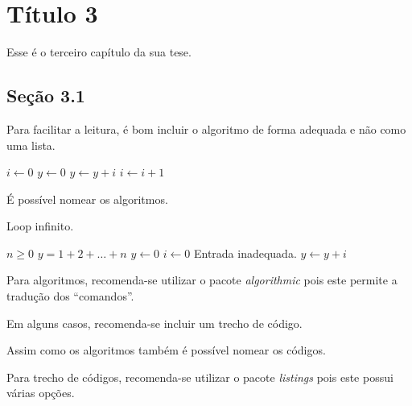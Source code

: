 \chapter{Título 3}
Esse é o terceiro capítulo da sua tese.

\section{Seção 3.1}
Para facilitar a leitura, é bom incluir o algoritmo de forma adequada e não
como uma lista.
\begin{algorithmic}[2]
    \STATE $i \leftarrow 0$
    \STATE $y \leftarrow 0$
        \STATE $y \leftarrow y + i$
        \STATE $i \leftarrow i + 1$
    \ENDFOR
\end{algorithmic}

É possível nomear os algoritmos.
\begin{algorithm}
    \caption{Loop infinito.}
    \label{alg:loop_inf}
    \begin{algorithmic}
        \REQUIRE $n \geq 0$
        \ENSURE $y = 1 + 2 + \ldots + n$
        \STATE $y \leftarrow 0$
        \STATE $i \leftarrow 0$
            \PRINT Entrada inadequada.
        \ELSE
                \STATE $y \leftarrow y + i$
            \ENDWHILE
        \ENDIF
    \end{algorithmic}
\end{algorithm}

Para algoritmos, recomenda-se utilizar o pacote
\emph{algorithmic} pois este
permite a tradução dos ``comandos''.

Em alguns casos, recomenda-se incluir um trecho de
código.


Assim como os algoritmos também é possível nomear os códigos.


Para trecho de códigos,  recomenda-se utilizar o pacote
\emph{listings} pois
este possui várias opções.
